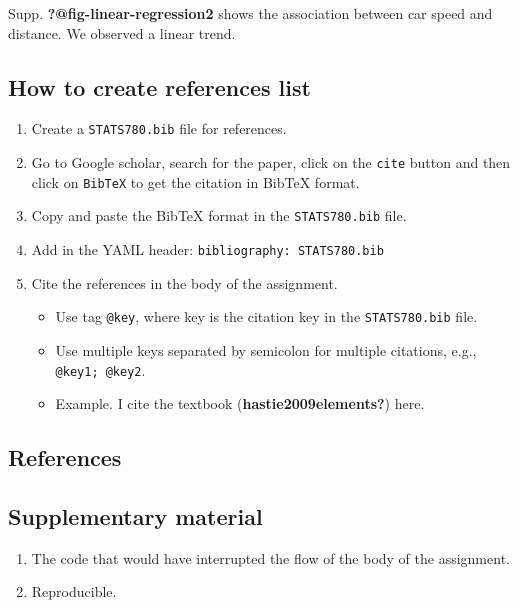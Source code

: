 \documentclass[
  11pt,
  letterpaper,
  DIV=11,
  numbers=noendperiod]{scrartcl}
\providecommand{\tightlist}{%
  \setlength{\itemsep}{0pt}\setlength{\parskip}{0pt}}
\begin{document}
Supp. \textbf{?@fig-linear-regression2} shows the association between
car speed and distance. We observed a linear trend.

\subsection{How to create references
list}\label{how-to-create-references-list}

\begin{enumerate}
\def\labelenumi{\arabic{enumi}.}
\tightlist
\item
  Create a \texttt{STATS780.bib} file for references.
\item
  Go to Google scholar, search for the paper, click on the \texttt{cite}
  button and then click on \texttt{BibTeX} to get the citation in BibTeX
  format.
\item
  Copy and paste the BibTeX format in the \texttt{STATS780.bib} file.
\item
  Add in the YAML header: \texttt{bibliography:\ STATS780.bib}
\item
  Cite the references in the body of the assignment.

  \begin{itemize}
  \tightlist
  \item
    Use tag \texttt{@key}, where key is the citation key in the
    \texttt{STATS780.bib} file.
  \item
    Use multiple keys separated by semicolon for multiple citations,
    e.g., \texttt{@key1;\ @key2}.
  \item
    Example. I cite the textbook (\textbf{hastie2009elements?}) here.
  \end{itemize}
\end{enumerate}

\newpage

\subsection{References}\label{references}

\newpage

\subsection{Supplementary material}\label{supplementary-material}

\begin{enumerate}
\def\labelenumi{\arabic{enumi}.}
\item
  The code that would have interrupted the flow of the body of the
  assignment.
\item
  Reproducible.
\end{enumerate}
\end{document}
